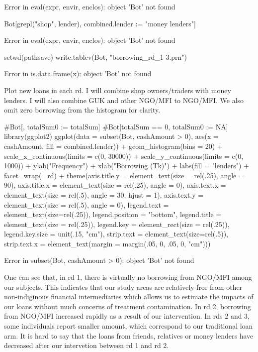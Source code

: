 \begin{Schunk}
\begin{Soutput}
Error in eval(expr, envir, enclos): object 'Bot' not found
\end{Soutput}
\begin{Sinput}
Bot[grepl("shop", lender), combined.lender := "money lenders"]
\end{Sinput}
\begin{Soutput}
Error in eval(expr, envir, enclos): object 'Bot' not found
\end{Soutput}
\begin{Sinput}
setwd(pathsave)
write.tablev(Bot, "borrowing_rd_1-3.prn")
\end{Sinput}
\begin{Soutput}
Error in is.data.frame(x): object 'Bot' not found
\end{Soutput}
\end{Schunk}
Plot new loans in each rd. I will combine \textsf{shop owners/traders} with \textsf{money lenders}. I will also combine \textsf{GUK} and \textsf{other NGO/MFI} to \textsf{NGO/MFI}. We also omit zero borrowing from the histogram for clarity.
\begin{Schunk}
\begin{Sinput}
#Bot[, totalSum0 := totalSum]
#Bot[totalSum == 0, totalSum0 := NA]
library(ggplot2)
ggplot(data = subset(Bot, cashAmount > 0), aes(x = cashAmount, fill = combined.lender)) +
	geom_histogram(bins = 20) + 
	scale_x_continuous(limits = c(0, 30000)) +
	scale_y_continuous(limits = c(0, 1000)) +
	ylab("Frequency") + xlab("Borrowing (Tk)") + labs(fill = "lenders") +
	facet_wrap(~ rd) + 
	theme(axis.title.y = element_text(size = rel(.25), angle = 90), 
		axis.title.x = element_text(size = rel(.25), angle = 0),
		axis.text.x = element_text(size = rel(.5), angle = 30, hjust = 1),
		axis.text.y = element_text(size = rel(.5), angle = 0),
		legend.text = element_text(size=rel(.25)), 
		legend.position = "bottom", 
		legend.title = element_text(size = rel(.25)),
		legend.key = element_rect(size = rel(.25)),
		legend.key.size = unit(.15, "cm"),
		strip.text = element_text(size=rel(.5)),
		strip.text.x = element_text(margin = margin(.05, 0, .05, 0, "cm")))
\end{Sinput}
\begin{Soutput}
Error in subset(Bot, cashAmount > 0): object 'Bot' not found
\end{Soutput}
\end{Schunk}
One can see that, in rd 1, there is virtually no borrowing from NGO/MFI among our subjects. This indicates that our study areas are relatively free from other non-indiginous financial intermediaries which allows us to estimate the impacts of our loans without much concerns of treatment contamination. In rd 2, borrowing from NGO/MFI increased rapidly as a result of our intervention. In rds 2 and 3, some individuals report smaller amount, which correspond to our traditional loan arm. It is hard to say that the loans from \textsf{friends, relatives} or \textsf{money lenders} have decreased after our intervetion between rd 1 and rd 2.


